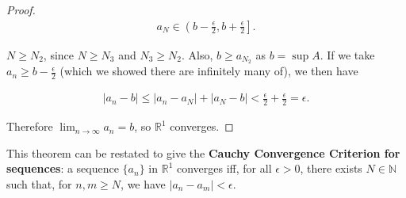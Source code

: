 \documentclass[12pt]{article}
\begin{document}
\begin{thm}
\begin{proof}
    \begin{align*}
      a_N \in \left( b - \frac{\epsilon}{2}, b + \frac{\epsilon}{2} \right].
    \end{align*}

    $N \geq N_2$, since $N \geq N_3$ and $N_3 \geq N_2$. Also, $b \geq a_{N_2}$ as $b
    = \sup A$. If we take $a_n \geq b - \frac{\epsilon}{2}$ (which we showed there
    are infinitely many of), we then have

    \begin{align*}
      |a_n - b| \leq |a_n - a_N| + |a_N - b| < \frac{\epsilon}{2} + \frac{\epsilon}{2} = \epsilon.
    \end{align*}

    Therefore $\lim_{n \to \infty} a_n = b$, so $\mathbb{R}^1$ converges.
  \end{proof}
\end{thm}

\begin{comm}
  This theorem can be restated to give the \textbf{Cauchy Convergence Criterion for
  sequences}: a sequence $\{a_n\}$ in $\mathbb{R}^1$ converges iff, for all $\epsilon
  > 0$, there exists $N \in \mathbb{N}$ such that, for $n,m \geq N$, we have $|a_n -
  a_m| < \epsilon$.
\end{comm}
\end{document}
